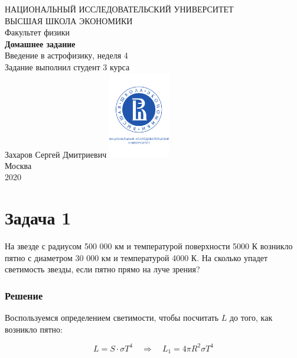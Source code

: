 \documentclass[a4paper, 12pt]{article}
\newcommand{\qrq}
{\ensuremath{\quad \Rightarrow \quad}} %
\begin{document}
	\begin{titlepage}
		\begin{center}
			$$$$
			$$$$
			$$$$
			$$$$
			{\Large{НАЦИОНАЛЬНЫЙ ИССЛЕДОВАТЕЛЬСКИЙ УНИВЕРСИТЕТ}}\\
			\vspace{0.1cm}
			{\Large{ВЫСШАЯ ШКОЛА ЭКОНОМИКИ}}\\
			\vspace{0.25cm}
			{\large{Факультет физики}}\\
			\vspace{5.5cm}
			{\Huge\textbf{{Домашнее задание}}}\\%
			\vspace{1cm}
			{\LARGE{Введение в астрофизику, неделя 4}}\\%
			\vspace{2cm}
			{Задание выполнил студент 3 курса}\\
			{Захаров Сергей Дмитриевич}
			\vfill
			\includegraphics[width = 0.2\textwidth]{HSElogo}\\
			\vfill
			Москва\\
			2020
		\end{center}
	\end{titlepage}

\section*{Задача 1}

На звезде с радиусом 500 000 км и температурой поверхности 5000 К возникло пятно с диаметром 30 000 км и температурой 4000 К. На сколько упадет светимость звезды, если пятно прямо на луче зрения?

\subsubsection*{Решение}

Воспользуемся определением светимости, чтобы посчитать $L$ до того, как возникло пятно:

\begin{equation}
	L = S \cdot \sigma T^4 \qrq L_1 = 4 \pi R^2 \sigma T^4
\end{equation}
\end{document}
